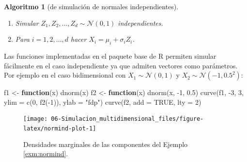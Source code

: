 \documentclass[
]{book}
\newenvironment{Shaded}{\begin{snugshade}}{\end{snugshade}}
\newcommand{\AttributeTok}[1]{\textcolor[rgb]{0.77,0.63,0.00}{#1}}
\newcommand{\ConstantTok}[1]{\textcolor[rgb]{0.00,0.00,0.00}{#1}}
\newcommand{\ControlFlowTok}[1]{\textcolor[rgb]{0.13,0.29,0.53}{\textbf{#1}}}
\newcommand{\DecValTok}[1]{\textcolor[rgb]{0.00,0.00,0.81}{#1}}
\newcommand{\FloatTok}[1]{\textcolor[rgb]{0.00,0.00,0.81}{#1}}
\newcommand{\FunctionTok}[1]{\textcolor[rgb]{0.00,0.00,0.00}{#1}}
\newcommand{\NormalTok}[1]{#1}
\newcommand{\OtherTok}[1]{\textcolor[rgb]{0.56,0.35,0.01}{#1}}
\newcommand{\SpecialCharTok}[1]{\textcolor[rgb]{0.00,0.00,0.00}{#1}}
\newcommand{\StringTok}[1]{\textcolor[rgb]{0.31,0.60,0.02}{#1}}
\theoremstyle{break}
\newtheorem{conjecture}{Algoritmo}[chapter]
\theoremstyle{nonumberplain}
\begin{document}
\begin{conjecture}[de simulación de normales independientes]
\protect\hypertarget{cnj:mnorm-indep}{}\label{cnj:mnorm-indep}

\begin{enumerate}
\def\labelenumi{\arabic{enumi}.}
\item
  Simular \(Z_1, Z_2, \ldots, Z_d \sim \mathcal{N} \left( 0, 1 \right)\) independientes.
\item
  Para \(i = 1, 2, \ldots, d\) hacer \(X_i = \mu_i + \sigma_i Z_i\).
\end{enumerate}

\end{conjecture}

Las funciones implementadas en el paquete base de R permiten simular fácilmente en el caso independiente ya que admiten vectores como parámetros.
Por ejemplo en el caso bidimensional con \(X_1 \sim \mathcal{N}\left( 0, 1\right)\) y \(X_2 \sim \mathcal{N}\left( -1, 0.5^2 \right)\):



\begin{Shaded}
\begin{Highlighting}[]
\NormalTok{f1 }\OtherTok{\textless{}{-}} \ControlFlowTok{function}\NormalTok{(x) }\FunctionTok{dnorm}\NormalTok{(x)}
\NormalTok{f2 }\OtherTok{\textless{}{-}} \ControlFlowTok{function}\NormalTok{(x) }\FunctionTok{dnorm}\NormalTok{(x, }\SpecialCharTok{{-}}\DecValTok{1}\NormalTok{, }\FloatTok{0.5}\NormalTok{)}
\FunctionTok{curve}\NormalTok{(f1, }\SpecialCharTok{{-}}\DecValTok{3}\NormalTok{, }\DecValTok{3}\NormalTok{, }\AttributeTok{ylim =} \FunctionTok{c}\NormalTok{(}\DecValTok{0}\NormalTok{, }\FunctionTok{f2}\NormalTok{(}\SpecialCharTok{{-}}\DecValTok{1}\NormalTok{)), }\AttributeTok{ylab =} \StringTok{"fdp"}\NormalTok{)}
\FunctionTok{curve}\NormalTok{(f2, }\AttributeTok{add =} \ConstantTok{TRUE}\NormalTok{, }\AttributeTok{lty =} \DecValTok{2}\NormalTok{)}
\end{Highlighting}
\end{Shaded}

\begin{figure}[!htb]

{\centering \texttt{[image: 06-Simulacion\_multidimensional\_files/figure-latex/normind-plot-1]} 

}

\caption{Densidades marginales de las componentes del Ejemplo \ref{exm:normind}.}\label{fig:normind-plot}
\end{figure}
\end{document}
